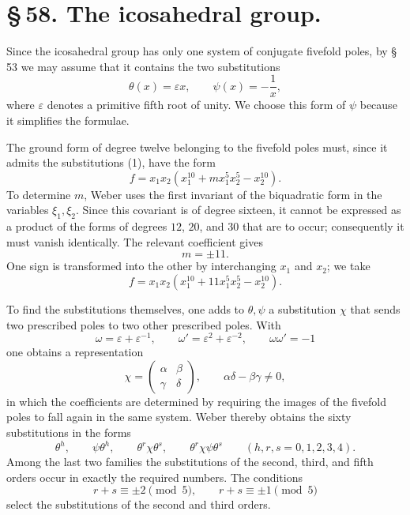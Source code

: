 \documentclass[11pt]{article}
\providecommand{\eps}{\varepsilon}
\providecommand{\eps}{\varepsilon}
\providecommand{\mat}[4]{\begin{pmatrix}#1&#2\\#3&#4\end{pmatrix}}
\providecommand{\mat}[4]{\begin{pmatrix}#1&#2\\#3&#4\end{pmatrix}}
\begin{document}
\section*{\S\,58. The icosahedral group.}

Since the icosahedral group has only one system of conjugate fivefold poles, by \S\,53 we may assume that it contains the two substitutions
\begin{equation}
 \theta(x)=\eps x,\qquad \psi(x)=-\frac1x,
\tag{1}
\end{equation}
where $\eps$ denotes a primitive fifth root of unity. We choose this form of $\psi$ because it simplifies the formulae.

The ground form of degree twelve belonging to the fivefold poles must, since it admits the substitutions (1), have the form
\begin{equation}
 f=x_1x_2(x_1^{10}+m x_1^5x_2^5-x_2^{10}).
\tag{2}
\end{equation}
To determine $m$, Weber uses the first invariant of the biquadratic form in the variables $\xi_1,\xi_2$. Since this covariant is of degree sixteen, it cannot be expressed as a product of the forms of degrees $12$, $20$, and $30$ that are to occur; consequently it must vanish identically. The relevant coefficient gives
\[
 m=\pm 11.
\]
One sign is transformed into the other by interchanging $x_1$ and $x_2$; we take
\begin{equation}
 f=x_1x_2(x_1^{10}+11x_1^5x_2^5-x_2^{10}).
\tag{3}
\end{equation}

To find the substitutions themselves, one adds to $\theta,\psi$ a substitution $\chi$ that sends two prescribed poles to two other prescribed poles. With
\[
 \omega=\eps+\eps^{-1},\qquad \omega'=\eps^2+\eps^{-2},\qquad
 \omega\omega'=-1
\tag{4}
\]
one obtains a representation
\begin{equation}
 \chi=\mat{\alpha}{\beta}{\gamma}{\delta},
\qquad
 \alpha\delta-\beta\gamma\ne0,
\tag{5}
\end{equation}
in which the coefficients are determined by requiring the images of the fivefold poles to fall again in the same system. Weber thereby obtains the sixty substitutions in the forms
\begin{equation}
 \theta^h,\qquad
 \psi\theta^h,\qquad
 \theta^r\chi\theta^s,\qquad
 \theta^r\chi\psi\theta^s\qquad (h,r,s=0,1,2,3,4).
\tag{6}
\end{equation}
Among the last two families the substitutions of the second, third, and fifth orders occur in exactly the required numbers. The conditions
\[
 r+s\equiv \pm2\pmod5,\qquad r+s\equiv \pm1\pmod5
\]
select the substitutions of the second and third orders.
\end{document}
